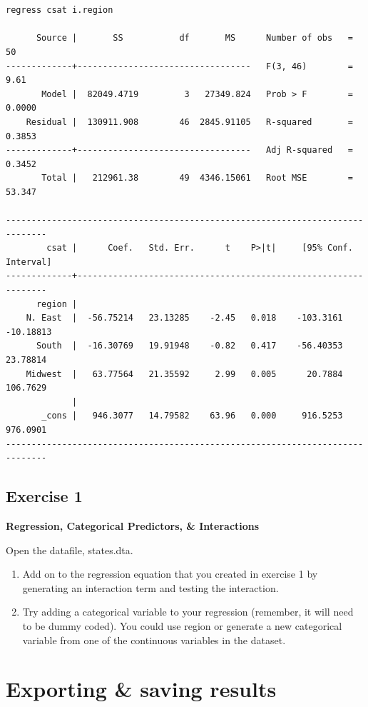 \documentclass[]{book}
\providecommand{\tightlist}{%
  \setlength{\itemsep}{0pt}\setlength{\parskip}{0pt}}
\begin{document}
\begin{verbatim}


regress csat i.region

      Source |       SS           df       MS      Number of obs   =        50
-------------+----------------------------------   F(3, 46)        =      9.61
       Model |  82049.4719         3   27349.824   Prob > F        =    0.0000
    Residual |  130911.908        46  2845.91105   R-squared       =    0.3853
-------------+----------------------------------   Adj R-squared   =    0.3452
       Total |   212961.38        49  4346.15061   Root MSE        =    53.347

------------------------------------------------------------------------------
        csat |      Coef.   Std. Err.      t    P>|t|     [95% Conf. Interval]
-------------+----------------------------------------------------------------
      region |
    N. East  |  -56.75214   23.13285    -2.45   0.018    -103.3161   -10.18813
      South  |  -16.30769   19.91948    -0.82   0.417    -56.40353    23.78814
    Midwest  |   63.77564   21.35592     2.99   0.005      20.7884    106.7629
             |
       _cons |   946.3077   14.79582    63.96   0.000     916.5253    976.0901
------------------------------------------------------------------------------
\end{verbatim}

\hypertarget{exercise-1-8}{%
\subsection{Exercise 1}\label{exercise-1-8}}

\textbf{Regression, Categorical Predictors, \& Interactions}

Open the datafile, states.dta.

\begin{enumerate}
\def\labelenumi{\arabic{enumi}.}
\tightlist
\item
  Add on to the regression equation that you created in exercise 1 by generating an interaction term and testing the interaction.
\item
  Try adding a categorical variable to your regression (remember, it will need to be dummy coded). You could use region or generate a new categorical variable from one of the continuous variables in the dataset.
\end{enumerate}

\hypertarget{exporting-saving-results}{%
\section{Exporting \& saving results}\label{exporting-saving-results}}
\end{document}
